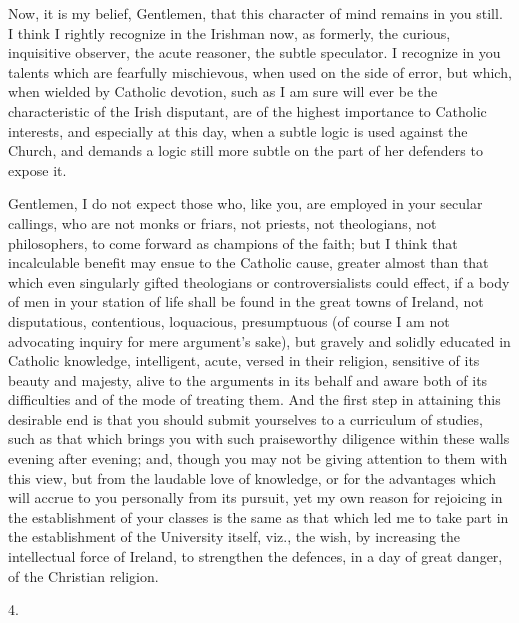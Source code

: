 Now, it is my belief, Gentlemen, that this character of mind
remains in you still. I think I rightly recognize in the Irishman now,
as formerly, the curious, inquisitive observer, the acute reasoner,
the subtle speculator. I recognize in you talents which are fearfully
mischievous, when used on the side of error, but which, when wielded
by Catholic devotion, such as I am sure will ever be the
characteristic of the Irish disputant, are of the highest importance
to Catholic interests, and especially at this day, when a subtle logic
is used against the Church, and demands a logic still more subtle on
the part of her defenders to expose it.

Gentlemen, I do not expect those who, like you, are employed in
your secular callings, who are not monks or friars, not priests, not
theologians, not philosophers, to come forward as champions of the
faith; but I think that incalculable benefit may ensue to the Catholic
cause, greater almost than that which even singularly gifted
theologians or controversialists could effect, if a body of men in
your station of life shall be found in the great towns of Ireland, not
disputatious, contentious, loquacious, presumptuous (of course I am
not advocating inquiry for mere argument's sake), but gravely and
solidly educated in Catholic knowledge, intelligent, acute, versed in
their religion, sensitive of its beauty and majesty, alive to the
arguments in its behalf and aware both of its difficulties and of the
mode of treating them. And the first step in attaining this desirable
end is that you should submit yourselves to a curriculum of
studies, such as that which brings you with such praiseworthy
diligence within these walls evening after evening; and, though you
may not be giving attention to them with this view, but from the
laudable love of knowledge, or for the advantages which will accrue to
you personally from its pursuit, yet my own reason for rejoicing in
the establishment of your classes is the same as that which led me to
take part in the establishment of the University itself, viz., the
wish, by increasing the intellectual force of Ireland, to strengthen
the defences, in a day of great danger, of the Christian religion.

4.

